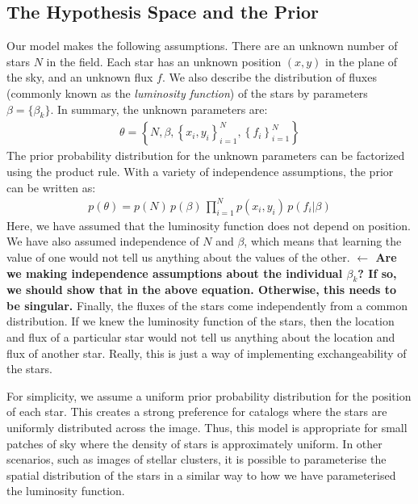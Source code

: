 \documentclass[letterpaper, 11pt]{article}
\begin{document}
\subsection{The Hypothesis Space and the Prior}
Our model makes the following assumptions. There are an unknown number of stars
$N$ in the field. Each star has an unknown
position $(x,y)$ in the plane of the sky, and an unknown flux $f$. We also
describe the distribution of fluxes (commonly known as the {\it luminosity
function}) of the stars by parameters $\beta = \{\beta_k \}$.
In summary, the unknown
parameters are:
\begin{eqnarray}
\theta = \left\{N, \beta, \left\{x_i, y_i\right\}_{i=1}^N,
\left\{f_i\right\}_{i=1}^N\right\}
\end{eqnarray}
The prior probability distribution for the unknown parameters can be factorized
using the product rule. With a variety of independence assumptions, the prior
can be written as:
\begin{eqnarray}
p(\theta) = p(N) \, p(\beta) \, \prod_{i=1}^N p(x_i, y_i) \,
p(f_i | \beta)
\end{eqnarray}
Here, we have assumed that the luminosity function does not depend on position.
We have also assumed independence of $N$ and $\beta$, which means that
learning the value of one would not tell us anything about the values of the
other. {\bf $\gets$ Are we making independence assumptions about the individual
$\beta_k$? If so, we should show that in the above equation. Otherwise, this
needs to be singular.} Finally, the fluxes of the stars come independently from
a common distribution. If we knew the luminosity
function of the stars, then the location and flux of a particular star would
not tell us anything about the location and flux of another star. Really, this
is just a way of implementing exchangeability of the stars.

For simplicity, we assume a uniform prior probability distribution for the
position of each star. This creates a strong preference for catalogs where
the stars are uniformly distributed across the image. Thus, this model is
appropriate for small patches of sky where the density of stars is approximately
uniform. In other scenarios, such as images of stellar clusters, it is possible
to parameterise the spatial distribution of the stars in a similar way to how
we have parameterised the luminosity function.
\end{document}
